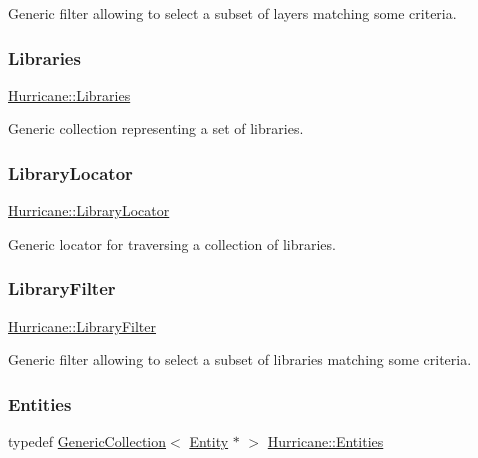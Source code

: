 Generic filter allowing to select a subset of layers matching some criteria. \mbox{\label{namespaceHurricane_a2868a53bbb0507710460ff02fab77cad}} 
\subsubsection{\texorpdfstring{Libraries}{Libraries}}
{\footnotesize\ttfamily \mbox{\hyperlink{namespaceHurricane_a2868a53bbb0507710460ff02fab77cad}{Hurricane\+::\+Libraries}}}

Generic collection representing a set of libraries. \mbox{\label{namespaceHurricane_a0477ab8ee799bb25ce9521ac16dbb6b9}} 
\subsubsection{\texorpdfstring{Library\+Locator}{LibraryLocator}}
{\footnotesize\ttfamily \mbox{\hyperlink{namespaceHurricane_a0477ab8ee799bb25ce9521ac16dbb6b9}{Hurricane\+::\+Library\+Locator}}}

Generic locator for traversing a collection of libraries. \mbox{\label{namespaceHurricane_a72d63f6bfd54feac2663e60430fd443d}} 
\subsubsection{\texorpdfstring{Library\+Filter}{LibraryFilter}}
{\footnotesize\ttfamily \mbox{\hyperlink{namespaceHurricane_a72d63f6bfd54feac2663e60430fd443d}{Hurricane\+::\+Library\+Filter}}}

Generic filter allowing to select a subset of libraries matching some criteria. \mbox{\label{namespaceHurricane_af50ef2888fd2a5b58b0de14cdfaabc56}} 
\subsubsection{\texorpdfstring{Entities}{Entities}}
{\footnotesize\ttfamily typedef \mbox{\hyperlink{classHurricane_1_1GenericCollection}{Generic\+Collection}}$<$ \mbox{\hyperlink{classHurricane_1_1Entity}{Entity}} $\ast$ $>$ \mbox{\hyperlink{namespaceHurricane_af50ef2888fd2a5b58b0de14cdfaabc56}{Hurricane\+::\+Entities}}}

